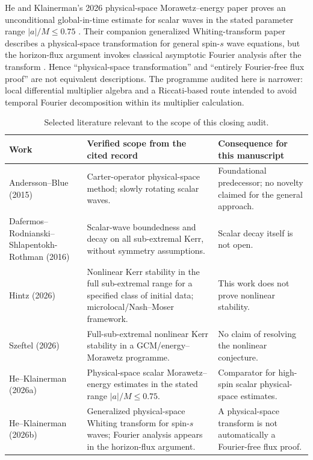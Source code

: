 \documentclass[11pt,a4paper]{article}
\theoremstyle{remark}
\theoremstyle{definition}
\begin{document}
He and Klainerman's 2026 physical-space Morawetz--energy paper proves an unconditional global-in-time estimate for scalar waves in the stated parameter range $|a|/M\le0.75$ \cite{HeKlainerman2026a}. Their companion generalized Whiting-transform paper describes a physical-space transformation for general spin-$s$ wave equations, but the horizon-flux argument invokes classical asymptotic Fourier analysis after the transform \cite{HeKlainerman2026b}. Hence ``physical-space transformation'' and ``entirely Fourier-free flux proof'' are not equivalent descriptions. The programme audited here is narrower: local differential multiplier algebra and a Riccati-based route intended to avoid temporal Fourier decomposition within its multiplier calculation.

\begin{table}[H]
\centering
\caption{Selected literature relevant to the scope of this closing audit.}
\label{tab:refs}
\small
\begin{tabularx}{\linewidth}{@{}p{3.0cm}p{3.8cm}X@{}}
\toprule
Work & Verified scope from the cited record & Consequence for this manuscript \\
\midrule
Andersson--Blue (2015) & Carter-operator physical-space method; slowly rotating scalar waves. & Foundational predecessor; no novelty claimed for the general approach. \\
Dafermos--Rodnianski--Shlapentokh-Rothman (2016) & Scalar-wave boundedness and decay on all sub-extremal Kerr, without symmetry assumptions. & Scalar decay itself is not open. \\
Hintz (2026) & Nonlinear Kerr stability in the full sub-extremal range for a specified class of initial data; microlocal/Nash--Moser framework. & This work does not prove nonlinear stability. \\
Szeftel (2026) & Full-sub-extremal nonlinear Kerr stability in a GCM/energy--Morawetz programme. & No claim of resolving the nonlinear conjecture. \\
He--Klainerman (2026a) & Physical-space scalar Morawetz--energy estimates in the stated range $|a|/M\le0.75$. & Comparator for high-spin scalar physical-space estimates. \\
He--Klainerman (2026b) & Generalized physical-space Whiting transform for spin-$s$ waves; Fourier analysis appears in the horizon-flux argument. & A physical-space transform is not automatically a Fourier-free flux proof. \\
\bottomrule
\end{tabularx}
\end{table}
\end{document}

